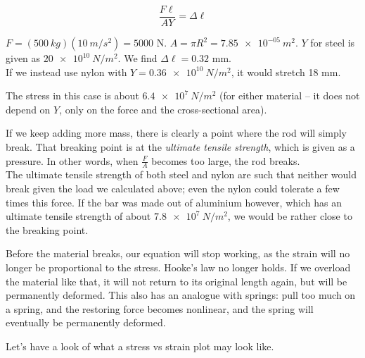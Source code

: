 \begin{equation}
\frac{F \ell}{A Y} = \Delta \ell
\end{equation}

$F = (\SI{500}{kg})(\SI{10}{m/s^2}) = 5000$ N. $A = \pi R^2 = \SI{7.85e-05}{m^2}$. $Y$ for steel is given as $\SI{20e10}{N/m^2}$. We find $\Delta \ell = 0.32$ mm.\\
If we instead use nylon with $Y = \SI{0.36e10}{N/m^2}$, it would stretch 18 mm.

The stress in this case is about $\SI{6.4e7}{N/m^2}$ (for either material -- it does not depend on $Y$, only on the force and the cross-sectional area).

If we keep adding more mass, there is clearly a point where the rod will simply break. That breaking point is at the \emph{ultimate tensile strength}, which is given as a pressure. In other words, when $\displaystyle \frac{F}{A}$ becomes too large, the rod breaks.\\
The ultimate tensile strength of both steel and nylon are such that neither would break given the load we calculated above; even the nylon could tolerate a few times this force. If the bar was made out of aluminium however, which has an ultimate tensile strength of about $\SI{7.8e7}{N/m^2}$, we would be rather close to the breaking point.

Before the material breaks, our equation will stop working, as the strain will no longer be proportional to the stress. Hooke's law no longer holds. If we overload the material like that, it will not return to its original length again, but will be permanently deformed. This also has an analogue with springs: pull too much on a spring, and the restoring force becomes nonlinear, and the spring will eventually be permanently deformed.

Let's have a look of what a stress vs strain plot may look like.

\begin{figure}[H]
  \centering
{}
\end{figure}


